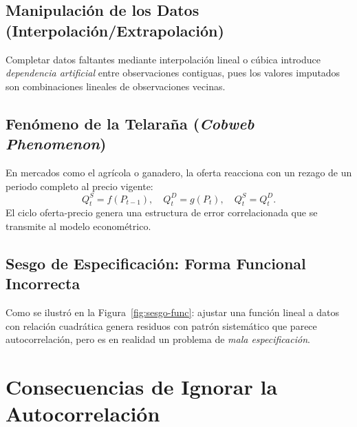 \documentclass[12pt,a4paper]{article}
\theoremstyle{definition}
\theoremstyle{remark}
\begin{document}
\subsection{Manipulación de los Datos (Interpolación/Extrapolación)}

Completar datos faltantes mediante interpolación lineal o cúbica
introduce \emph{dependencia artificial} entre observaciones contiguas,
pues los valores imputados son combinaciones lineales de observaciones
vecinas.

\subsection{Fenómeno de la Telaraña (\textit{Cobweb Phenomenon})}

En mercados como el agrícola o ganadero, la oferta reacciona con un
rezago de un periodo completo al precio vigente:
\begin{equation}
  Q_t^S = f(P_{t-1}), \quad Q_t^D = g(P_t), \quad
  Q_t^S = Q_t^D.
  \label{eq:telarana}
\end{equation}
El ciclo oferta-precio genera una estructura de error correlacionada
que se transmite al modelo econométrico.

\subsection{Sesgo de Especificación: Forma Funcional Incorrecta}

Como se ilustró en la Figura~\ref{fig:sesgo-func}: ajustar una función
lineal a datos con relación cuadrática genera residuos con patrón
sistemático que parece autocorrelación, pero es en realidad un problema
de \emph{mala especificación}.

\section{Consecuencias de Ignorar la Autocorrelación}
\label{sec:consecuencias}
\end{document}
